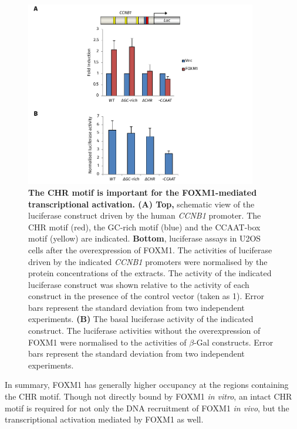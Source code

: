 \begin{figure}[!h]
    \centering
    \includegraphics[width=0.9\textwidth]{chapter3/figures_foxm1/fig28.pdf}
    \caption[The CHR motif is important for the FOXM1-mediated transcriptional activation]{\textbf{The CHR motif is important for the FOXM1-mediated transcriptional activation. (A) Top,} schematic view of the luciferase construct driven by the human \textit{CCNB1} promoter. The CHR motif (red), the GC-rich motif (blue) and the CCAAT-box motif (yellow) are indicated. \textbf{Bottom}, luciferase assays in U2OS cells after the overexpression of FOXM1. The activities of luciferase driven by the indicated \textit{CCNB1} promoters were normalised by the protein concentrations of the extracts. The activity of the indicated luciferase construct was shown relative to the activity of each construct in the presence of the control vector (taken as 1). Error bars represent the standard deviation from two independent experiments. \textbf{(B)} The basal luciferase activity of the indicated construct. The luciferase activities without the overexpression of FOXM1 were normalised to the activities of $\beta$-Gal constructs. Error bars represent the standard deviation from two independent experiments.}
    \label{fig:fig28}
\end{figure}

In summary, FOXM1 has generally higher occupancy at the regions containing the CHR motif. Though not directly bound by FOXM1 \textit{in vitro}, an intact CHR motif is required for not only the DNA recruitment of FOXM1 \textit{in vivo}, but the transcriptional activation mediated by FOXM1 as well.

